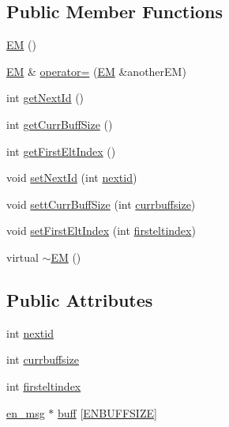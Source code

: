 \subsection*{\-Public \-Member \-Functions}
\begin{DoxyCompactItemize}
\item 
\hyperlink{class_e_m_ab63fb999a41e57947ecd2e61c073c5ef}{\-E\-M} ()
\item 
\hyperlink{class_e_m}{\-E\-M} \& \hyperlink{class_e_m_a5d8a513e96af2ea0effeed5efb0ac658}{operator=} (\hyperlink{class_e_m}{\-E\-M} \&another\-E\-M)
\item 
int \hyperlink{class_e_m_a1b212e3582198f87702f208663d2a001}{get\-Next\-Id} ()
\item 
int \hyperlink{class_e_m_a5594e7c089507bbad73044c2cbb36aea}{get\-Curr\-Buff\-Size} ()
\item 
int \hyperlink{class_e_m_a901bb3d251f1944d2bb56538006036c5}{get\-First\-Elt\-Index} ()
\item 
void \hyperlink{class_e_m_a11bfe493228a27be761405adcecbf942}{set\-Next\-Id} (int \hyperlink{class_e_m_abe82d3a166960b6c717b29111e337ada}{nextid})
\item 
void \hyperlink{class_e_m_a04735702f4943bd77292f2fb8d8b5a7d}{sett\-Curr\-Buff\-Size} (int \hyperlink{class_e_m_a8199bc20a63a93126b276a1d968ca72c}{currbuffsize})
\item 
void \hyperlink{class_e_m_a6fbcaa7e821bbd0e7285b389ccf9397e}{set\-First\-Elt\-Index} (int \hyperlink{class_e_m_a7c7dfed53d8ee4b28b738f8a4dc47424}{firsteltindex})
\item 
virtual \hyperlink{class_e_m_a9d270b3946c58c5e536ba7e20034b98e}{$\sim$\-E\-M} ()
\end{DoxyCompactItemize}
\subsection*{\-Public \-Attributes}
\begin{DoxyCompactItemize}
\item 
int \hyperlink{class_e_m_abe82d3a166960b6c717b29111e337ada}{nextid}
\item 
int \hyperlink{class_e_m_a8199bc20a63a93126b276a1d968ca72c}{currbuffsize}
\item 
int \hyperlink{class_e_m_a7c7dfed53d8ee4b28b738f8a4dc47424}{firsteltindex}
\item 
\hyperlink{structen__msg}{en\-\_\-msg} $\ast$ \hyperlink{class_e_m_adf16de55850031c37ec50d40595304e9}{buff} \mbox{[}\hyperlink{_emul_net_8h_a7f4df9525bf7d9549f92f96115710b39}{\-E\-N\-B\-U\-F\-F\-S\-I\-Z\-E}\mbox{]}
\end{DoxyCompactItemize}


